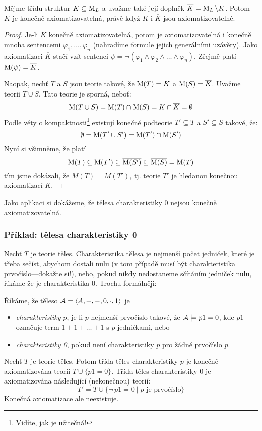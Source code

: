 \begin{theorem}\label{theorem:finite-axiomatizability}
    Mějme třídu struktur $K\subseteq \operatorname{M}_L$ a uvažme také její doplněk $\overline{K}=\operatorname{M}_L\setminus K$. Potom $K$ je konečně axiomatizovatelná, právě když $K$ i $\overline{K}$ jsou axiomatizovatelné.
\end{theorem}
\begin{proof}
Je-li $K$ konečně axiomatizovatelná, potom je axiomatizovatelná i konečně mnoha sentencemi $\varphi_1,\dots,\varphi_n$ (nahradíme formule jejich generálními uzávěry). Jako axiomatizaci $\overline{K}$ stačí vzít sentenci $\psi=\neg(\varphi_1\land\varphi_2\land\dots\land\varphi_n)$. Zřejmě platí $\operatorname{M}(\psi)=\overline{K}$.

Naopak, nechť $T$ a $S$ jsou teorie takové, že $\operatorname{M}(T)=K$ a $\operatorname{M}(S)=\overline{K}$. Uvažme teorii $T\cup S$. Tato teorie je sporná, neboť:
$$
\operatorname{M}(T\cup S)=\operatorname{M}(T)\cap \operatorname{M}(S)=K\cap\overline{K}=\emptyset
$$
Podle věty o kompaktnosti\footnote{Vidíte, jak je užitečná!} existují konečné podteorie $T'\subseteq T$ a $S'\subseteq S$ takové, že:
$$
\emptyset = \operatorname{M}(T'\cup S')=\operatorname{M}(T')\cap \operatorname{M}(S')
$$
Nyní si všimněme, že platí
$$
\operatorname{M}(T)\subseteq \operatorname{M}(T')\subseteq \overline{\operatorname{M}(S')}\subseteq \overline{\operatorname{M}(S)}=\operatorname{M}(T)
$$
tím jsme dokázali, že $M(T)=M(T')$, tj. teorie $T'$ je hledanou konečnou axiomatizací $K$.
\end{proof}

Jako aplikaci si dokážeme, že tělesa charakteristiky 0 nejsou konečně axiomatizovatelná.

\subsubsection*{Příklad: tělesa charakteristiky 0}

Nechť $T$ je teorie těles. Charakteristika tělesa je nejmenší počet jedniček, které je třeba sečíst, abychom dostali nulu (v tom případě musí být charakteristika prvočíslo---dokažte si!), nebo, pokud nikdy nedostaneme sčítáním jedniček nulu, říkáme že je charakteristika 0. Trochu formálněji:

\begin{definition}
Říkáme, že těleso $\mathcal{A}=\langle A,+,-,0,\cdot,1 \rangle$ je
\begin{itemize}
    \item \emph{charakteristiky $p$}, je-li $p$ nejmenší prvočíslo takové, že $\mathcal{A}\models p1=0$, kde $p1$ označuje term $1+1+\dots+1$ s $p$ jedničkami, nebo
    \item \emph{charakteristiky 0}, pokud není charakteristiky $p$ pro žádné prvočíslo $p$.
\end{itemize}
\end{definition}
Nechť $T$ je teorie těles. Potom třída těles charakteristiky $p$ je konečně axiomatizována teorií $T\cup \{p1=0\}$. Třída těles charakteristiky 0 je axiomatizována následující (nekonečnou) teorií:
$$
T'=T\cup \{\neg\, p1=0\mid p\text{ je prvočíslo}\}
$$
Konečná axiomatizace ale neexistuje.

